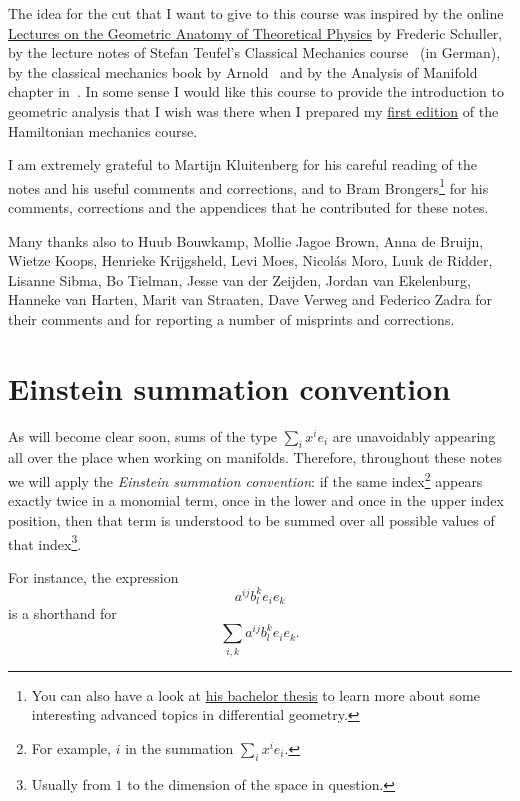 \documentclass[nobib, a4paper]{tufte-book}
\theoremstyle{plain}
\theoremstyle{definition}
\theoremstyle{remark}
\begin{document}
The idea for the cut that I want to give to this course was inspired by the online \href{https://www.video.uni-erlangen.de/course/id/242}{Lectures on the Geometric Anatomy of Theoretical Physics} by Frederic Schuller, by the lecture notes of Stefan Teufel's Classical Mechanics course~\cite{lectures:teufel} (in German), by the classical mechanics book by Arnold~\cite{book:arnold} and by the Analysis of Manifold chapter in~\cite{book:thirring}.
In some sense I would like this course to provide the introduction to geometric analysis that I wish was there when I prepared my \href{https://www.mseri.me/lecture-notes-hamiltonian-mechanics/}{first edition} of the Hamiltonian mechanics course.

I am extremely grateful to Martijn Kluitenberg for his careful reading of the notes and his useful comments and corrections, and to Bram Brongers\footnote{You can also have a look at \href{https://fse.studenttheses.ub.rug.nl/25344/}{his bachelor thesis} to learn more about some interesting advanced topics in differential geometry.} for his comments, corrections and the appendices that he contributed for these notes.

Many thanks also to Huub Bouwkamp, Mollie Jagoe Brown, Anna de Bruijn, Wietze Koops, Henrieke Krijgsheld, Levi Moes, Nicol\'as Moro, Luuk de Ridder, Lisanne Sibma, Bo Tielman, Jesse van der Zeijden, Jordan van Ekelenburg, Hanneke van Harten, Marit van Straaten, Dave Verweg and Federico Zadra for their comments and for reporting a number of misprints and corrections.

\mainmatter

\chapter*{Einstein summation convention}

As will become clear soon, sums of the type $\sum_i x^i e_i$ are unavoidably appearing all over the place when working on manifolds.
Therefore, throughout these notes we will apply the \emph{Einstein summation convention}: if the same index\footnote{For example, $i$ in the summation $\sum_i x^i e_i$.} appears exactly twice in a monomial term, once in the lower and once in the upper index position, then that term is understood to be summed over all possible values of that index\footnote{Usually from $1$ to the dimension of the space in question.}.

For instance, the expression
\begin{equation}
  a^{ij}b_l^k e_i e_k
\end{equation}
is a shorthand for
\begin{equation}
  \sum_{i,k} a^{ij}b_l^k e_i e_k.
\end{equation}
\end{document}
